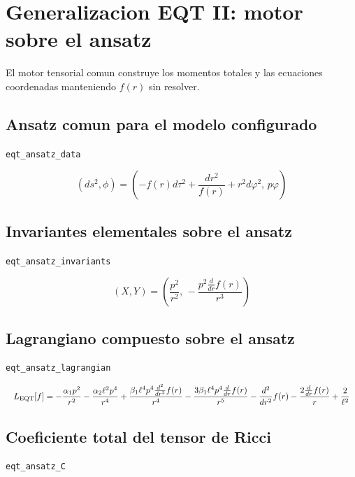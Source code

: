 \documentclass[11pt,a4paper]{article}
\begin{document}
\section{Generalizacion EQT II: motor sobre el ansatz}

El motor tensorial comun construye los momentos totales y las ecuaciones coordenadas manteniendo $f(r)$ sin resolver.

\subsection{Ansatz comun para el modelo configurado}

\noindent\texttt{eqt\_ansatz\_data}\par\nopagebreak[4]

\[
(ds^2,\phi) = \left(-f(r)d\tau^2+\frac{dr^2}{f(r)}+r^2d\varphi^2,\,p\varphi\right)
\]

\subsection{Invariantes elementales sobre el ansatz}

\noindent\texttt{eqt\_ansatz\_invariants}\par\nopagebreak[4]

\[
(X,Y) = \left(\frac{p^{2}}{r^{2}},\,- \frac{p^{2} \frac{d}{d r} f{\left(r \right)}}{r^{3}}\right)
\]

\subsection{Lagrangiano compuesto sobre el ansatz}

\noindent\texttt{eqt\_ansatz\_lagrangian}\par\nopagebreak[4]

\[
\resizebox{\textwidth}{!}{$\displaystyle L_{\mathrm{EQT}}[f] = - \frac{\alpha_{1} p^{2}}{r^{2}} - \frac{\alpha_{2} \ell^{2} p^{4}}{r^{4}} + \frac{\beta_{1} \ell^{4} p^{4} \frac{d^{2}}{d r^{2}} f{\left(r \right)}}{r^{4}} - \frac{3 \beta_{1} \ell^{4} p^{4} \frac{d}{d r} f{\left(r \right)}}{r^{5}} - \frac{d^{2}}{d r^{2}} f{\left(r \right)} - \frac{2 \frac{d}{d r} f{\left(r \right)}}{r} + \frac{2}{\ell^{2}}$}
\]

\subsection{Coeficiente total del tensor de Ricci}

\noindent\texttt{eqt\_ansatz\_C}\par\nopagebreak[4]
\end{document}
